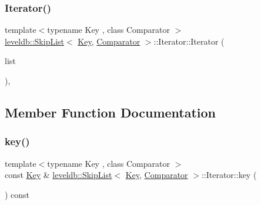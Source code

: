 \subsubsection{\texorpdfstring{Iterator()}{Iterator()}}
{\footnotesize\ttfamily template$<$typename Key , class Comparator $>$ \\
\mbox{\hyperlink{classleveldb_1_1_skip_list}{leveldb\+::\+Skip\+List}}$<$ \mbox{\hyperlink{namespaceleveldb_a7e9a9725b13fa0bd922d885280dfab95}{Key}}, \mbox{\hyperlink{structleveldb_1_1_comparator}{Comparator}} $>$\+::Iterator\+::\+Iterator (\begin{DoxyParamCaption}\item[{const \mbox{\hyperlink{classleveldb_1_1_skip_list}{Skip\+List}} $\ast$}]{list }\end{DoxyParamCaption})\hspace{0.3cm}{\ttfamily [inline]}, {\ttfamily [explicit]}}



\subsection{Member Function Documentation}
\mbox{\label{classleveldb_1_1_skip_list_1_1_iterator_a8b9bc9940fbf067a3fb500ebae6999be}} 
\subsubsection{\texorpdfstring{key()}{key()}}
{\footnotesize\ttfamily template$<$typename Key , class Comparator $>$ \\
const \mbox{\hyperlink{namespaceleveldb_a7e9a9725b13fa0bd922d885280dfab95}{Key}} \& \mbox{\hyperlink{classleveldb_1_1_skip_list}{leveldb\+::\+Skip\+List}}$<$ \mbox{\hyperlink{namespaceleveldb_a7e9a9725b13fa0bd922d885280dfab95}{Key}}, \mbox{\hyperlink{structleveldb_1_1_comparator}{Comparator}} $>$\+::Iterator\+::key (\begin{DoxyParamCaption}{ }\end{DoxyParamCaption}) const\hspace{0.3cm}{\ttfamily [inline]}}

